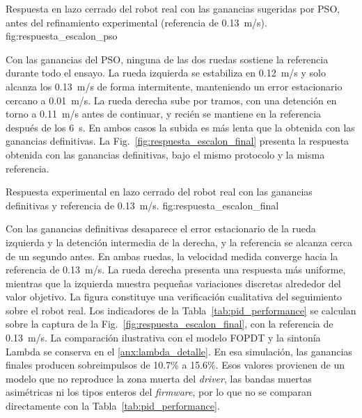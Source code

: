 {Respuesta en lazo cerrado del robot real con las ganancias sugeridas por PSO,
antes del refinamiento experimental (referencia de 0.13~m/s).}
{fig:respuesta_escalon_pso}

Con las ganancias del PSO, ninguna de las dos ruedas sostiene la referencia
durante todo el ensayo. La rueda izquierda se estabiliza en 0.12~m/s y solo
alcanza los 0.13~m/s de forma intermitente, manteniendo un error estacionario
cercano a 0.01~m/s. La rueda derecha sube por tramos, con una detención en
torno a 0.11~m/s antes de continuar, y recién se mantiene en la referencia
después de los 6~s. En ambos casos la subida es más lenta que la obtenida con
las ganancias definitivas. La Fig.~\ref{fig:respuesta_escalon_final} presenta la respuesta obtenida con las ganancias definitivas, bajo el mismo protocolo y la misma referencia.

{Respuesta experimental en lazo cerrado del robot real con las ganancias
definitivas y referencia de 0.13~m/s.}
{fig:respuesta_escalon_final}

Con las ganancias definitivas desaparece el error estacionario de la rueda
izquierda y la detención intermedia de la derecha, y la referencia se alcanza
cerca de un segundo antes. En ambas ruedas, la velocidad medida converge hacia la referencia de
0.13~m/s. La rueda derecha presenta una respuesta más uniforme, mientras que
la izquierda muestra pequeñas variaciones discretas alrededor del valor
objetivo. La figura constituye una verificación cualitativa del seguimiento
sobre el robot real. Los indicadores de la Tabla~\ref{tab:pid_performance}
se calculan sobre la captura de la Fig.~\ref{fig:respuesta_escalon_final}, con la referencia de 0.13~m/s. La
comparación ilustrativa con el modelo FOPDT y la sintonía Lambda se conserva
en el \ref{anx:lambda_detalle}. En esa simulación, las ganancias finales producen sobreimpulsos de 10.7\% a 15.6\%. Esos valores provienen de un modelo que no reproduce la zona muerta del \textit{driver}, las bandas muertas asimétricas ni los tipos enteros del \textit{firmware}, por lo que no se comparan directamente con la Tabla~\ref{tab:pid_performance}.

